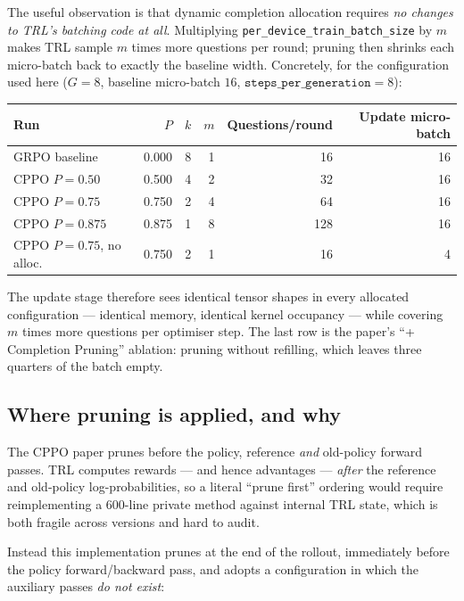 \documentclass[11pt,a4paper]{article}
\begin{document}
The useful observation is that dynamic completion allocation requires
\emph{no changes to TRL's batching code at all}. Multiplying
\texttt{per\_device\_train\_batch\_size} by $m$ makes TRL sample $m$ times
more questions per round; pruning then shrinks each micro-batch back to
exactly the baseline width. Concretely, for the configuration used here
($G=8$, baseline micro-batch $16$, $\texttt{steps\_per\_generation}=8$):

\begin{center}
\begin{tabular}{lrrrrr}
\toprule
Run & $P$ & $k$ & $m$ & Questions/round & Update micro-batch \\
\midrule
GRPO baseline          & 0.000 & 8 & 1 & 16  & 16 \\
CPPO $P=0.50$          & 0.500 & 4 & 2 & 32  & 16 \\
CPPO $P=0.75$          & 0.750 & 2 & 4 & 64  & 16 \\
CPPO $P=0.875$         & 0.875 & 1 & 8 & 128 & 16 \\
CPPO $P=0.75$, no alloc.& 0.750 & 2 & 1 & 16  & \phantom{0}4 \\
\bottomrule
\end{tabular}
\end{center}

The update stage therefore sees identical tensor shapes in every allocated
configuration --- identical memory, identical kernel occupancy --- while
covering $m$ times more questions per optimiser step. The last row is the
paper's ``+ Completion Pruning'' ablation: pruning without refilling, which
leaves three quarters of the batch empty.

\subsection{Where pruning is applied, and why}
\label{sec:pruning-point}

The CPPO paper prunes before the policy, reference \emph{and} old-policy
forward passes. TRL computes rewards --- and hence advantages --- \emph{after}
the reference and old-policy log-probabilities, so a literal ``prune first''
ordering would require reimplementing a 600-line private method against
internal TRL state, which is both fragile across versions and hard to audit.

Instead this implementation prunes at the end of the rollout, immediately
before the policy forward/backward pass, and adopts a configuration in which
the auxiliary passes \emph{do not exist}:
\end{document}
